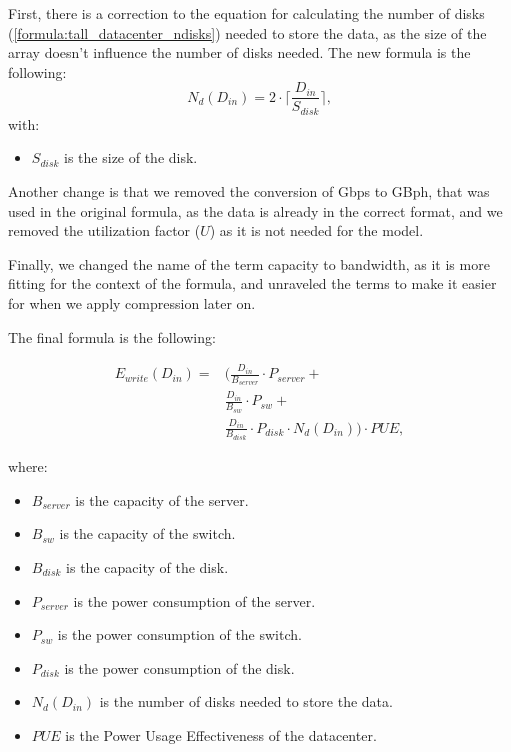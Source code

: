     First, there is a correction to the equation for calculating the number of disks (\ref{formula:tall_datacenter_ndisks}) needed to store the data, as the size of the array doesn't influence the number of disks needed.
    The new formula is the following:
    \begin{equation}
        \label{formula:storage_ndisks}
        N_d(D_{in}) = 2 \cdot \bigg \lceil \frac{D_{in}}{S_{disk}} \bigg \rceil,
    \end{equation} 
    \noindent with:
    \begin{itemize}
        \item $S_{disk}$ is the size of the disk.
    \end{itemize}

    Another change is that we removed the conversion of Gbps to GBph, that was used in the original formula, as the data is already in the correct format, and we removed the utilization factor ($U$) as it is not needed for the model.

    Finally, we changed the name of the term capacity to bandwidth, as it is more fitting for the context of the formula, and unraveled the terms to make it easier for when we apply compression later on.

    The final formula is the following:

    \begin{equation}
    \label{formula:upload_server_write}
    \begin{split}
        E_{write}(D_{in}) = & \Bigg( \frac{D_{in}}{B_{server}} \cdot P_{server} + \\ & \frac{D_{in}}{B_{sw}} \cdot P_{sw} + \\ & \frac{D_{in}}{B_{disk}} \cdot P_{disk} \cdot N_d(D_{in}) \Bigg) \cdot PUE,
    \end{split}
    \end{equation}

    \noindent where:
    \begin{itemize}
        \item $B_{server}$ is the capacity of the server.
        \item $B_{sw}$ is the capacity of the switch.
        \item $B_{disk}$ is the capacity of the disk.
        \item $P_{server}$ is the power consumption of the server.
        \item $P_{sw}$ is the power consumption of the switch.
        \item $P_{disk}$ is the power consumption of the disk.
        \item $N_d(D_{in})$ is the number of disks needed to store the data.
        \item $PUE$ is the Power Usage Effectiveness of the datacenter.
    \end{itemize}

